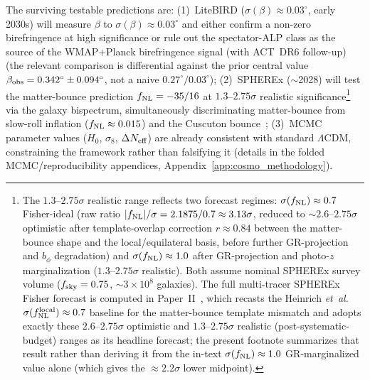 \documentclass[aps,prd,twocolumn,superscriptaddress,showpacs,preprintnumbers,nofootinbib,longbibliography,floatfix]{revtex4-2}
\newcommand{\Neff}{N_{\rm eff}}
\newcommand{\etal}{\textit{et~al.}}
\newcommand{\fnl}{f_{\rm NL}}
\begin{document}
The surviving testable predictions are: (1)~LiteBIRD ($\sigma(\beta)\approx 0.03^\circ$,
early 2030s) will measure $\beta$ to $\sigma(\beta)\approx 0.03^\circ$ and either confirm a non-zero birefringence at high significance or rule out the spectator-ALP class as the source of the WMAP$+$Planck birefringence signal (with ACT~DR6 follow-up) (the relevant comparison is differential against the prior central value $\beta_{\rm obs} = 0.342^\circ \pm 0.094^\circ$, not a naive $0.27^\circ / 0.03^\circ$);
(2)~SPHEREx (${\sim}$2028) will test the matter-bounce prediction $\fnl = -35/16$
at $1.3$--$2.75\sigma$ realistic significance\footnote{\label{fn:spherex_range}The
$1.3$--$2.75\sigma$ realistic range reflects two forecast regimes: $\sigma(\fnl)\approx 0.7$
Fisher-ideal (raw ratio $|\fnl|/\sigma = 2.1875/0.7 \approx 3.13\sigma$, reduced
to $\sim$$2.6$--$2.75\sigma$ optimistic after template-overlap correction $r\approx 0.84$
between the matter-bounce shape and the local/equilateral basis, before further
GR-projection and $b_\phi$ degradation) and $\sigma(\fnl)\approx 1.0$ after
GR-projection and photo-$z$ marginalization ($1.3$--$2.75\sigma$ realistic). Both
assume nominal SPHEREx survey volume ($f_{\rm sky}=0.75$, ${\sim}\!3\times 10^8$
galaxies). The full multi-tracer SPHEREx Fisher forecast is computed in
Paper~II~\cite{Golden2026P2}, which recasts the Heinrich \etal\
$\sigma(\fnl^{\rm local})\approx 0.7$ baseline for the matter-bounce template
mismatch and adopts exactly these $2.6$--$2.75\sigma$ optimistic and
$1.3$--$2.75\sigma$ realistic (post-systematic-budget) ranges as its headline
forecast; the present footnote summarizes that result rather than deriving it
from the in-text $\sigma(\fnl)\approx 1.0$ GR-marginalized value alone (which
gives the $\approx 2.2\sigma$ lower midpoint).}~\cite{Heinrich:2023,Golden2026P2}
via the galaxy bispectrum, simultaneously discriminating matter-bounce from
slow-roll inflation ($\fnl\approx 0.015$) and the Cuscuton
bounce~\cite{Dehghani:2025cusc}; (3)~MCMC parameter values ($H_0$, $\sigma_8$,
$\Delta\Neff$) are already consistent with standard $\Lambda$CDM, constraining the
framework rather than falsifying it (details in the folded MCMC/reproducibility appendices, Appendix~\ref{app:cosmo_methodology}).

\label{sec:conjunctive}


\end{document}
